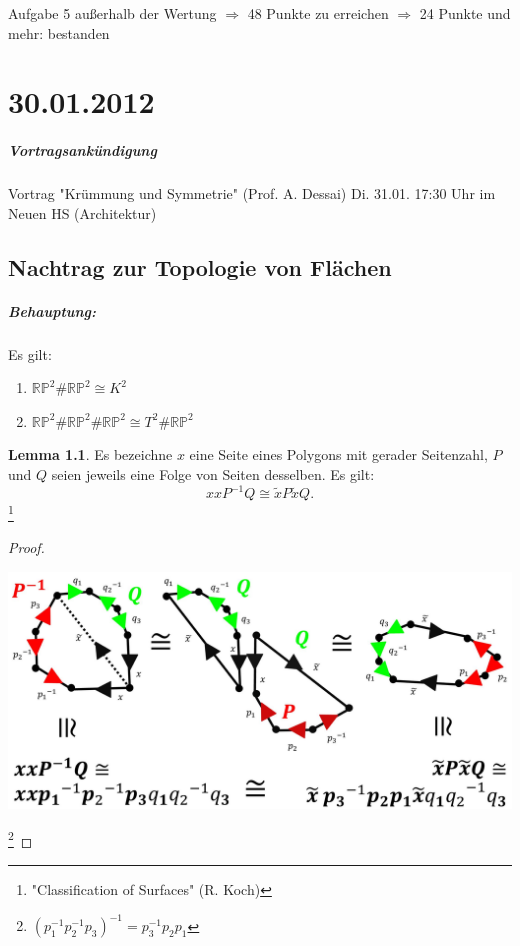 \documentclass[a4paper,11pt,notitlepage]{report}
\theoremstyle{definition}
\newtheorem{lemma}{Lemma}[chapter]
\newcommand{\R}{{\ensuremath{\mathbb{R}}}}
\newcommand{\Prim}{{\ensuremath{\mathbb{P}}}}
\begin{document}
\hrulefill
\newline
Aufgabe 5 außerhalb der Wertung
\newline
$\Rightarrow$ 48 Punkte zu erreichen
$\Rightarrow$ 24 Punkte und mehr: bestanden

\chapter{30.01.2012}
\paragraph{Vortragsankündigung}
Vortrag "Krümmung und Symmetrie" (Prof. A. Dessai)
Di. 31.01. 17:30 Uhr im Neuen HS (Architektur)

\section{Nachtrag zur Topologie von Flächen}
\paragraph{Behauptung:} Es gilt:
\begin{enumerate}
	\item $\R \Prim^2 \# \R \Prim^2 \cong K^2$
	\item $\R \Prim^2 \# \R \Prim^2 \# \R \Prim^2 \cong T^2 \# \R \Prim^2$
\end{enumerate}

\begin{lemma}
	Es bezeichne $x$ eine Seite eines Polygons mit gerader Seitenzahl, $P$ und $Q$ seien jeweils eine Folge von Seiten desselben.
	Es gilt:
	$$xxP^{-1}Q \cong \widetilde{x} P \widetilde{x} Q.$$
	\footnote{"Classification of Surfaces" (R. Koch)}
\end{lemma}

\begin{proof}
	\begin{center}
		\includegraphics[scale=0.3]{images/2012_01_30_Bild1.jpg}
	\end{center}
	\footnote{$(p_1^{-1} p_2^{-1} p_3)^{-1} = p_3^{-1} p_2 p_1$}
\end{proof}
\end{document}
